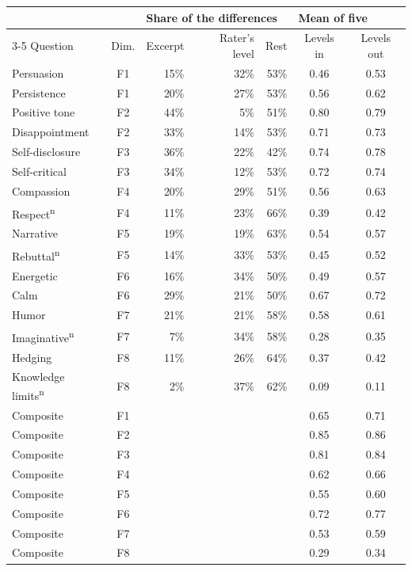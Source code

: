 {\footnotesize
\begin{tabular}{@{}l c rrr cc@{}}
\toprule
 & & \multicolumn{3}{l}{Share of the differences} & \multicolumn{2}{l}{Mean of five} \\
\cmidrule(r){3-5}\cmidrule{6-7}
Question & Dim. & Excerpt & Rater's level & Rest & Levels in & Levels out \\
\midrule
Persuasion & F1 & 15\% & 32\% & 53\% & 0.46 & 0.53 \\
Persistence & F1 & 20\% & 27\% & 53\% & 0.56 & 0.62 \\
Positive tone & F2 & 44\% & 5\% & 51\% & 0.80 & 0.79 \\
Disappointment & F2 & 33\% & 14\% & 53\% & 0.71 & 0.73 \\
Self-disclosure & F3 & 36\% & 22\% & 42\% & 0.74 & 0.78 \\
Self-critical & F3 & 34\% & 12\% & 53\% & 0.72 & 0.74 \\
Compassion & F4 & 20\% & 29\% & 51\% & 0.56 & 0.63 \\
Respect\textsuperscript{n} & F4 & 11\% & 23\% & 66\% & 0.39 & 0.42 \\
Narrative & F5 & 19\% & 19\% & 63\% & 0.54 & 0.57 \\
Rebuttal\textsuperscript{n} & F5 & 14\% & 33\% & 53\% & 0.45 & 0.52 \\
Energetic & F6 & 16\% & 34\% & 50\% & 0.49 & 0.57 \\
Calm & F6 & 29\% & 21\% & 50\% & 0.67 & 0.72 \\
Humor & F7 & 21\% & 21\% & 58\% & 0.58 & 0.61 \\
Imaginative\textsuperscript{n} & F7 & 7\% & 34\% & 58\% & 0.28 & 0.35 \\
Hedging & F8 & 11\% & 26\% & 64\% & 0.37 & 0.42 \\
Knowledge limits\textsuperscript{n} & F8 & 2\% & 37\% & 62\% & 0.09 & 0.11 \\
\midrule
Composite & F1 & & & & 0.65 & 0.71 \\
Composite & F2 & & & & 0.85 & 0.86 \\
Composite & F3 & & & & 0.81 & 0.84 \\
Composite & F4 & & & & 0.62 & 0.66 \\
Composite & F5 & & & & 0.55 & 0.60 \\
Composite & F6 & & & & 0.72 & 0.77 \\
Composite & F7 & & & & 0.53 & 0.59 \\
Composite & F8 & & & & 0.29 & 0.34 \\
\bottomrule
\end{tabular}}

